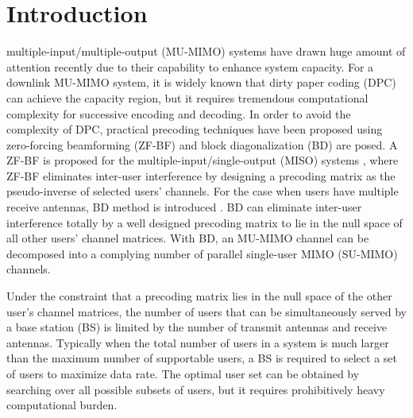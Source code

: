 \documentclass[journal,twoside]{IEEEtranTCOM}
\begin{document}
\section{Introduction} \label{Section:Introduction}
 multiple-input/multiple-output (MU-MIMO) systems have drawn huge amount of attention recently due to their capability to enhance system capacity. For a downlink MU-MIMO system, it is widely known that dirty paper coding (DPC) \cite{DPC} can achieve the capacity region, but it requires tremendous computational complexity for successive encoding and decoding. In order to avoid the complexity of DPC, practical precoding techniques have been proposed using  zero-forcing beamforming (ZF-BF) and  block diagonalization (BD) are posed. A ZF-BF is proposed for the multiple-input/single-output (MISO) systems \cite{ZF1,ZF2}, where ZF-BF eliminates inter-user interference by designing a precoding matrix as the pseudo-inverse of selected users' channels. For the case when users have multiple receive antennas, BD method is introduced \cite{BD}. BD can eliminate inter-user interference totally by a well designed precoding matrix to lie in the null space of all other users' channel matrices. With BD, an MU-MIMO channel can be decomposed into a complying number of parallel single-user MIMO (SU-MIMO) channels.

Under the constraint that a precoding matrix lies in the null space of the other user's channel matrices, the number of users that can be simultaneously served by a base station (BS) is limited by the number of transmit antennas and receive antennas. Typically when the total number of users in a system is much larger than the maximum number of supportable users, a BS is required to select a set of users to maximize data rate. The optimal user set can be obtained by searching over all possible subsets of users, but it requires prohibitively heavy computational burden.
\end{document}
